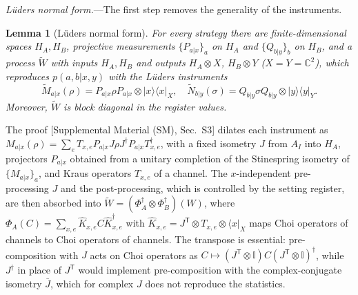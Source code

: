 \documentclass[aps,prl,twocolumn,superscriptaddress,longbibliography,nofootinbib]{revtex4-2}
\newtheorem{lemma}{Lemma}
\newcommand{\ket}[1]{\lvert #1\rangle}
\newcommand{\bra}[1]{\langle #1\rvert}
\newcommand{\one}{\mathbb{I}}
\newcommand{\tp}{\mathsf{T}}
\newcommand{\CC}{\mathbb{C}}
\begin{document}
\emph{L\"uders normal form.}---The first step removes the generality of the instruments.

\begin{lemma}[L\"uders normal form]\label{lem:lueders}
For every strategy there are finite-dimensional spaces $H_A,H_B$, projective measurements $\{P_{a|x}\}_a$ on $H_A$ and $\{Q_{b|y}\}_b$ on $H_B$, and a process $\widetilde W$ with inputs $H_A,H_B$ and outputs $H_A\otimes X$, $H_B\otimes Y$ ($X=Y=\CC^2$), which reproduces $p(a,b|x,y)$ with the L\"uders instruments
\begin{equation}
\widetilde M_{a|x}(\rho)=P_{a|x}\rho P_{a|x}\otimes\ket{x}\bra{x}_X ,\quad
\widetilde N_{b|y}(\sigma)=Q_{b|y}\sigma Q_{b|y}\otimes\ket{y}\bra{y}_Y .
\label{eq:lueders}
\end{equation}
Moreover, $\widetilde W$ is block diagonal in the register values.
\end{lemma}

The proof [Supplemental Material (SM), Sec.~S3] dilates each instrument as $M_{a|x}(\rho)=\sum_eT_{x,e}P_{a|x}J\rho J^\dagger P_{a|x}T_{x,e}^\dagger$, with a fixed isometry $J$ from $A_I$ into $H_A$, projectors $P_{a|x}$ obtained from a unitary completion of the Stinespring isometry of $\{M_{a|x}\}_a$, and Kraus operators $T_{x,e}$ of a channel. The $x$-independent pre-processing $J$ and the post-processing, which is controlled by the setting register, are then absorbed into $\widetilde W=(\Phi_A^\dagger\otimes\Phi_B^\dagger)(W)$, where $\Phi_A(C)=\sum_{x,e}\hat K_{x,e}C\hat K_{x,e}^\dagger$ with $\hat K_{x,e}=J^\tp\otimes T_{x,e}\otimes\bra{x}_X$ maps Choi operators of channels to Choi operators of channels. The transpose is essential: pre-composition with $J$ acts on Choi operators as $C\mapsto(J^\tp\otimes\one)C(J^\tp\otimes\one)^\dagger$, while $J^\dagger$ in place of $J^\tp$ would implement pre-composition with the complex-conjugate isometry $\bar J$, which for complex $J$ does not reproduce the statistics.
\end{document}
